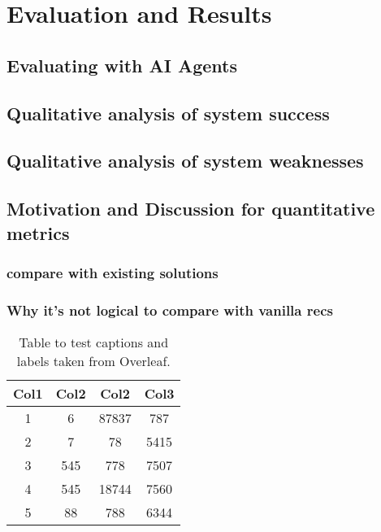 \chapter{Evaluation and Results} \label{chap:chap-5}


\section{Evaluating with AI Agents}

\section{Qualitative analysis of system success}

\section{Qualitative analysis of system weaknesses}

\section{Motivation and Discussion for quantitative metrics}

\subsection{compare with existing solutions}

\subsection{Why it's not logical to compare with vanilla recs}

\begin{table}[h!]
\centering
\begin{tabular}{c c c c} 
\toprule \toprule
Col1 & Col2 & Col2 & Col3 \\ 
\toprule \toprule
1 & 6 & 87837 & 787 \\ 
2 & 7 & 78 & 5415 \\
3 & 545 & 778 & 7507 \\
4 & 545 & 18744 & 7560 \\
5 & 88 & 788 & 6344 \\ 
\bottomrule
\end{tabular}
\caption{Table to test captions and labels taken from Overleaf.}
\label{table:1}
\end{table}

\Blindtext[2]